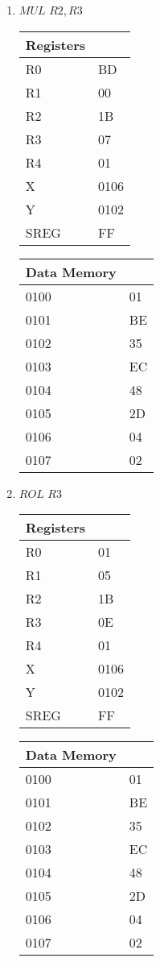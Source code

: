 \documentclass[12pt,letterpaper]{article}
\begin{document}
\begin{enumerate}
\begin{enumerate}[i]
    \item $MUL$  $R2,R3$\\
        \begin{tabular}{l l}
            Registers & \\
            \hline
            R0   & BD \\
            R1   & 00 \\
            R2   & 1B \\
            R3   & 07 \\
            R4   & 01 \\
            X    & 0106 \\
            Y    & 0102 \\
            SREG & FF \\
        \end{tabular}
        \begin{tabular}{l l}
            Data Memory & \\
            \hline
            0100 & 01 \\
            0101 & BE \\
            0102 & 35 \\
            0103 & EC \\
            0104 & 48 \\
            0105 & 2D \\
            0106 & 04 \\
            0107 & 02 \\
        \end{tabular}

    \item $ROL$  $R3$\\
        \begin{tabular}{l l}
            Registers & \\
            \hline
            R0   & 01 \\
            R1   & 05 \\
            R2   & 1B \\
            R3   & 0E \\
            R4   & 01 \\
            X    & 0106 \\
            Y    & 0102 \\
            SREG & FF \\
        \end{tabular}
        \begin{tabular}{l l}
            Data Memory & \\
            \hline
            0100 & 01 \\
            0101 & BE \\
            0102 & 35 \\
            0103 & EC \\
            0104 & 48 \\
            0105 & 2D \\
            0106 & 04 \\
            0107 & 02 \\
        \end{tabular}
    \end{enumerate}
\end{enumerate}
\end{document}
